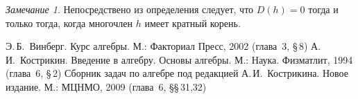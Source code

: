 \documentclass[a4paper,10pt]{amsart}
\theoremstyle{definition}
\theoremstyle{remark}
\newtheorem{remark}{Замечание}
\newtheorem{example}{Пример}
\begin{document}
\begin{remark}
Непосредствено из определения следует, что $D(h) = 0$ тогда и только
тогда, когда многочлен $h$ имеет кратный корень.
\end{remark}
%
%
%
%
%

\bigskip

\begin{thebibliography}{99}
Э.\,Б.~Винберг. Курс алгебры. М.: Факториал Пресс, 2002 (глава~3,
\S\,8)
А.\,И.~Кострикин. Введение в алгебру. Основы алгебры. М.: Наука.
Физматлит, 1994 (глава~6, \S\,2)
Сборник задач по алгебре под редакцией А.\,И.~Кострикина. Новое
издание. М.: МЦНМО, 2009 (глава~6, \S\S\,31,32)
\end{thebibliography}
\end{document}
